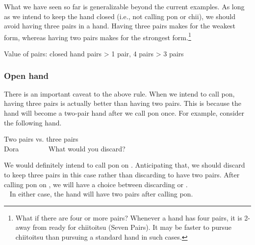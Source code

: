 \bigskip
What we have seen so far is generalizable beyond the current examples. As long as we intend to keep the hand closed (i.e., not calling {\jap pon} or {\jap chii}), we should avoid having three pairs in a hand. Having three pairs makes for the weakest form, whereas having two pairs makes for the strongest form.\footnote{What if there are four or more pairs? Whenever a hand has four pairs, it is 2-away from ready for {\jap chiitoitsu} (Seven Pairs). It may be faster to pursue {\jap chiitoitsu} than pursuing a standard hand in such cases.}

\bigskip

\color{MyRed}
\begin{itembox}[c]{Value of pairs: closed hand}
\centering{} pairs > 1 pair, 4 pairs > 3 pairs
\end{itembox}\normalcolor

\bigskip

\subsubsection{Open hand}

There is an important caveat to the above rule. 
When we intend to call {\jap pon}, having three pairs is actually better than having two pairs. This is because the hand will become a two-pair hand after we call {\jap pon} once.
For example, consider the following hand. 
\begin{itembox}[r]{Two pairs vs. three pairs}
\bp
{}\zhong\zhong~\zhong\\
\hfill\footnotesize{{\jap Dora}~~~~~~~~}
\ep
\vspace{-17pt}What would you discard? \vspace{-5pt}
\end{itembox}
\noindent
We would definitely intend to call {\jap pon} on {\LARGE\zhong}. Anticipating that, we should discard {\LARGE{}} to keep three pairs in this case rather than discarding {\LARGE{}} to have two pairs. After calling {\jap pon} on {\LARGE\zhong}, we will have a choice between discarding  {\LARGE{}} or {\LARGE{}}.
\bp
{}~\zhong\rzhong\zhong\\
~\zhong\rzhong\zhong
\ep
In either case, the hand will have two pairs after calling {\jap pon}. 

